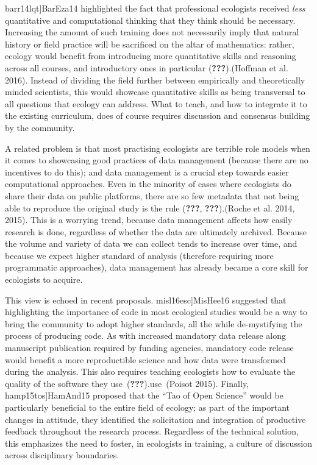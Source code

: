 \documentclass[11pt,serif]{article}
\begin{document}
\color{gray}{[}barr14lqt{]}\color{black}\color{purple}BarEza14\color{black}
highlighted the fact that professional ecologists received \emph{less}
quantitative and computational thinking that they think should be
necessary. Increasing the amount of such training does not necessarily
imply that natural history or field practice will be sacrificed on the
altar of mathematics: rather, ecology would benefit from introducing
more quantitative skills and reasoning across all courses, and
introductory ones in particular
\color{gray}({\textbf{???}}).\color{black}\color{purple}(Hoffman et al.
2016).\color{black} Instead of dividing the field further between
empirically and theoretically minded scientists, this would showcase
quantitative skills as being transversal to all questions that ecology
can address. What to teach, and how to integrate it to the existing
curriculum, does of course requires discussion and consensus building by
the community.

A related problem is that most practising ecologists are terrible role
models when it comes to showcasing good practices of data management
(because there are no incentives to do this); and data management is a
crucial step towards easier computational approaches. Even in the
minority of cases where ecologists do share their data on public
platforms, there are so few metadata that not being able to reproduce
the original study is the rule \color{gray}({\textbf{???}},
{\textbf{???}}).\color{black}\color{purple}(Roche et al. 2014,
2015).\color{black} This is a worrying trend, because data management
affects how easily research is done, regardless of whether the data are
ultimately archived. Because the volume and variety of data we can
collect tends to increase over time, and because we expect higher
standard of analysis (therefore requiring more programmatic approaches),
data management has already became a core skill for ecologists to
acquire.

This view is echoed in recent proposals.
\color{gray}{[}misl16esc{]}\color{black}\color{purple}MisHee16\color{black}
suggested that highlighting the importance of code in most ecological
studies would be a way to bring the community to adopt higher standards,
all the while de-mystifying the process of producing code.
\color{purple}As with increased mandatory data release along
manuscript\color{black} \color{purple}publication required by funding
agencies, mandatory code release would benefit a\color{black}
\color{purple}more reproductible science and how data were transformed
during the analysis.\color{black} This also requires teaching ecologists
how to evaluate the quality of the software they
\color{gray}use~({\textbf{???}}).\color{black}\color{purple}use~(Poisot
2015).\color{black} Finally,
\color{gray}{[}hamp15tos{]}\color{black}\color{purple}HamAnd15\color{black}
proposed that the ``Tao of Open Science'' would be particularly
beneficial to the entire field of ecology; as part of the important
changes in attitude, they identified the solicitation and integration of
productive feedback throughout the research process. Regardless of the
technical solution, this emphasizes the need to foster, in ecologists in
training, a culture of discussion across disciplinary
\color{purple}boundaries.\color{black}
\end{document}
